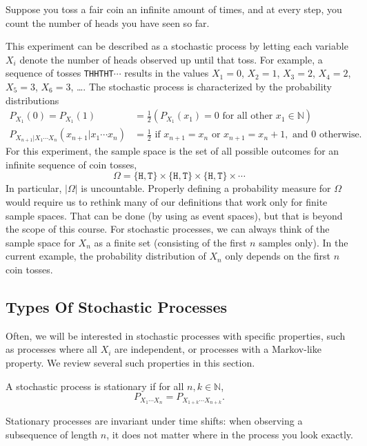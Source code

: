 \begin{example}\label{ex:stochastic-process}
Suppose you toss a fair coin an infinite amount of times, and at every step, you count the number of heads you have seen so far.

This experiment can be described as a stochastic process by letting each variable $X_i$ denote the number of heads observed up until that toss. For example, a sequence of tosses \texttt{THHTHT}$\cdots$ results in the values $X_1 = 0$, $X_2 = 1$, $X_3 = 2$, $X_4 = 2$, $X_5 = 3$, $X_6 = 3$, \dots . The stochastic process is characterized by the probability distributions
\begin{align*}
P_{X_1}(0) = P_{X_1}(1) &= \frac{1}{2} (P_{X_1}(x_1) = 0 \text{ for all other } x_1 \in \mathbb{N})\\ 
P_{X_{n+1}|X_1 \cdots X_n}(x_{n+1}|x_1\cdots x_{n}) &= \frac{1}{2} \text{ if } x_{n+1} = x_{n} \text { or } x_{n+1} = x_{n} + 1, \text{ and } 0 \text{ otherwise.}
\end{align*}
For this experiment, the sample space is the set of all possible outcomes for an infinite sequence of coin tosses,
\[
\Omega = \{\texttt{H},\texttt{T}\} \times \{\texttt{H},\texttt{T}\} \times \{\texttt{H},\texttt{T}\} \times \cdots
\]
In particular, $|\Omega|$ is uncountable. Properly defining a probability measure for $\Omega$ would require us to rethink many of our definitions that work only for finite sample spaces. That can be done (by using \href{https://en.wikipedia.org/wiki/Sigma-algebra}{} as event spaces), but that is beyond the scope of this course. For stochastic processes, we can always think of the sample space for $X_n$ as a finite set (consisting of the first $n$ samples only). In the current example, the probability distribution of $X_n$ only depends on the first $n$ coin tosses.
\end{example}

\subsection{Types Of Stochastic Processes}
Often, we will be interested in stochastic processes with specific properties, such as processes where all $X_i$ are independent, or processes with a Markov-like property. We review several such properties in this section.

\begin{definition}\label{def:stationary}
A stochastic process is stationary if for all $n,k \in \mathbb{N}$,
\[
P_{X_1 \cdots X_n} = P_{X_{1+k} \cdots X_{n+k}}.
\]
\end{definition}
Stationary processes are invariant under time shifts: when observing a subsequence of length $n$, it does not matter where in the process you look exactly.

